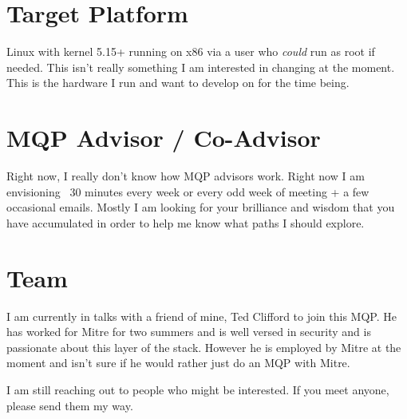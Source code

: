 \section{Target Platform}
Linux with kernel 5.15+ running on x86 via a user who \textit{could} run as root if needed. This isn't really something I am interested in changing at the moment. This is the hardware I run and want to develop on for the time being. 

\section{MQP Advisor / Co-Advisor}
Right now, I really don't know how MQP advisors work. Right now I am envisioning ~30 minutes every week or every odd week of meeting + a few occasional emails. Mostly I am looking for your brilliance and wisdom that you have accumulated in order to help me know what paths I should explore.


\section{Team}
I am currently in talks with a friend of mine, Ted Clifford to join this MQP. He has worked for Mitre for two summers and is well versed in security and is passionate about this layer of the stack. However he is employed by Mitre at the moment and isn't sure if he would rather just do an MQP with Mitre.

I am still reaching out to people who might be interested. If you meet anyone, please send them my way. 

